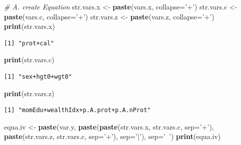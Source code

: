 \documentclass[
]{book}
\newenvironment{Shaded}{\begin{snugshade}}{\end{snugshade}}
\newcommand{\CommentTok}[1]{\textcolor[rgb]{0.56,0.35,0.01}{\textit{#1}}}
\newcommand{\DataTypeTok}[1]{\textcolor[rgb]{0.13,0.29,0.53}{#1}}
\newcommand{\KeywordTok}[1]{\textcolor[rgb]{0.13,0.29,0.53}{\textbf{#1}}}
\newcommand{\NormalTok}[1]{#1}
\newcommand{\StringTok}[1]{\textcolor[rgb]{0.31,0.60,0.02}{#1}}
\begin{document}
\begin{Shaded}
\begin{Highlighting}[]
\CommentTok{# A. create Equation}
\NormalTok{str.vars.x <-}\StringTok{ }\KeywordTok{paste}\NormalTok{(vars.x, }\DataTypeTok{collapse=}\StringTok{'+'}\NormalTok{)}
\NormalTok{str.vars.c <-}\StringTok{ }\KeywordTok{paste}\NormalTok{(vars.c, }\DataTypeTok{collapse=}\StringTok{'+'}\NormalTok{)}
\NormalTok{str.vars.z <-}\StringTok{ }\KeywordTok{paste}\NormalTok{(vars.z, }\DataTypeTok{collapse=}\StringTok{'+'}\NormalTok{)}
\KeywordTok{print}\NormalTok{(str.vars.x)}
\end{Highlighting}
\end{Shaded}

\begin{verbatim}
[1] "prot+cal"
\end{verbatim}

\begin{Shaded}
\begin{Highlighting}[]
\KeywordTok{print}\NormalTok{(str.vars.c)}
\end{Highlighting}
\end{Shaded}

\begin{verbatim}
[1] "sex+hgt0+wgt0"
\end{verbatim}

\begin{Shaded}
\begin{Highlighting}[]
\KeywordTok{print}\NormalTok{(str.vars.z)}
\end{Highlighting}
\end{Shaded}

\begin{verbatim}
[1] "momEdu+wealthIdx+p.A.prot+p.A.nProt"
\end{verbatim}

\begin{Shaded}
\begin{Highlighting}[]
\NormalTok{equa.iv <-}\StringTok{ }\KeywordTok{paste}\NormalTok{(var.y,}
                 \KeywordTok{paste}\NormalTok{(}\KeywordTok{paste}\NormalTok{(str.vars.x, str.vars.c, }\DataTypeTok{sep=}\StringTok{'+'}\NormalTok{),}
                       \KeywordTok{paste}\NormalTok{(str.vars.z, str.vars.c, }\DataTypeTok{sep=}\StringTok{'+'}\NormalTok{),}
                       \DataTypeTok{sep=}\StringTok{'|'}\NormalTok{),}
                 \DataTypeTok{sep=}\StringTok{'~'}\NormalTok{)}
\KeywordTok{print}\NormalTok{(equa.iv)}
\end{Highlighting}
\end{Shaded}
\end{document}
